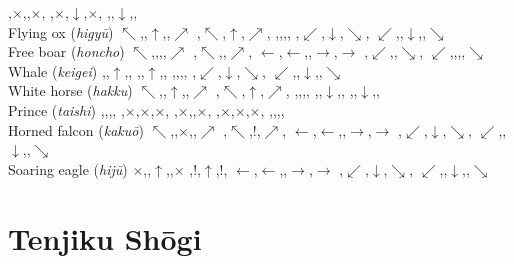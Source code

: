 \documentclass[10pt]{article}
\let\x=\times
\begin{document}
        {,$\x$,{\color{red}\Roku},$\x$,}%
        {,$\x$,$\downarrow$,$\x$,}%
        {,,$\downarrow$,,}
\\
Flying ox \Higyu ({\it higy\=u})
    \movediagramfivexfive%
        {$\nwarrow$,,$\uparrow$,,$\nearrow$}%
        {,$\nwarrow$,$\uparrow$,$\nearrow$,}%
        {,,{\color{red}\Gyu},,}%
        {,$\swarrow$,$\downarrow$,$\searrow$,}%
        {$\swarrow$,,$\downarrow$,,$\searrow$}
\\
Free boar \Honcho ({\it honcho})
    \movediagramfivexfive%
        {$\nwarrow$,,,,$\nearrow$}%
        {,$\nwarrow$,,$\nearrow$,}%
        {$\leftarrow$,$\leftarrow$,{\color{red}\Cho},$\rightarrow$,$\rightarrow$}%
        {,$\swarrow$,,$\searrow$,}%
        {$\swarrow$,,,,$\searrow$}
\\
Whale \Keii \Keigei ({\it keigei})
    \movediagramfivexfive%
        {,,$\uparrow$,,}%
        {,,$\uparrow$,,}%
        {,,{\color{red}\Keii},,}%
        {,$\swarrow$,$\downarrow$,$\searrow$,}%
        {$\swarrow$,,$\downarrow$,,$\searrow$}
\\
White horse \Ku \Hakku ({\it hakku})
    \movediagramfivexfive%
        {$\nwarrow$,,$\uparrow$,,$\nearrow$}%
        {,$\nwarrow$,$\uparrow$,$\nearrow$,}%
        {,,{\color{red}\Ku},,}%
        {,,$\downarrow$,,}%
        {,,$\downarrow$,,}
\\
Prince \Taishi ({\it taishi})
    \movediagramfivexfive%
        {,,,,}%
        {,$\x$,$\x$,$\x$,}%
        {,$\x$,{\color{red}\Tai},$\x$,}%
        {,$\x$,$\x$,$\x$,}%
        {,,,,}
\\
Horned falcon \Kakuo ({\it kaku\=o})
    \movediagramfivexfive%
        {$\nwarrow$,,$\x$,,$\nearrow$}%
        {,$\nwarrow$,!,$\nearrow$,}%
        {$\leftarrow$,$\leftarrow$,{\color{red}\Kuo},$\rightarrow$,$\rightarrow$}%
        {,$\swarrow$,$\downarrow$,$\searrow$,}%
        {$\swarrow$,,$\downarrow$,,$\searrow$}
\\
Soaring eagle \Hiju ({\it hij\=u})
    \movediagramfivexfive%
        {$\x$,,$\uparrow$,,$\x$}%
        {,!,$\uparrow$,!,}%
        {$\leftarrow$,$\leftarrow$,{\color{red}\Ju},$\rightarrow$,$\rightarrow$}%
        {,$\swarrow$,$\downarrow$,$\searrow$,}%
        {$\swarrow$,,$\downarrow$,,$\searrow$}
\\


\section{Tenjiku Sh\=ogi}
\end{document}
